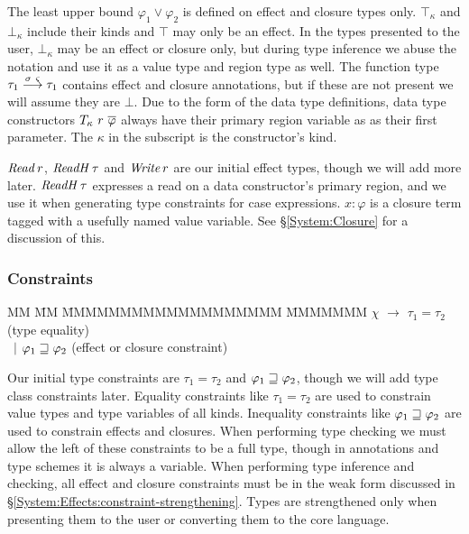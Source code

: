 The least upper bound $\varphi_1 \lor \varphi_2$ is defined on effect and closure types only. $\top_\kappa$ and $\bot_\kappa$ include their kinds and $\top$ may only be an effect. In the types presented to the user, $\bot_\kappa$ may be an effect or closure only, but during type inference we abuse the notation and use it as a value type and region type as well. The function type $\tau_1 \lfuna{\sigma \ \varsigma} \tau_1$ contains effect and closure annotations, but if these are not present we will assume they are $\bot$. Due to the form of the data type definitions, data type constructors $T_{\kappa} \ r \ \overline{\varphi}$ always have their primary region variable as as their first parameter. The $\kappa$ in the subscript is the constructor's kind. 

$\operatorname{\mathit{Read}} r$, $\operatorname{\mathit{ReadH}} \tau$ and $\operatorname{\mathit{Write}} r$ are our initial effect types, though we will add more later. $\operatorname{\mathit{ReadH}} \tau$ expresses a read on a data constructor's primary region, and we use it when generating type constraints for case expressions. $x : \varphi$  is a closure term tagged with a usefully named value variable. See \S\ref{System:Closure} for a discussion of this.



\bigskip
\bigskip
\vspace{-2em}
\subsubsection{Constraints}
\vspace{-1ex}
\begin{tabbing}
MM 	\= MM \= MMMMMMMMMMMMMMMMMMM \= MMMMMMM \kill
$\chi$ 	\> $\to$	\> $\tau_1 = \tau_2$				\> (type equality) \\
	\> \ $\mid$	\> $\varphi_1 \sqsupseteq \varphi_2$				\> (effect or closure constraint)
\end{tabbing}

Our initial type constraints are $\tau_1 = \tau_2$ and $\varphi_1 \sqsupseteq \varphi_2$, though we will add type class constraints later. Equality constraints like $\tau_1 = \tau_2$ are used to constrain value types and type variables of all kinds. Inequality constraints like $\varphi_1 \sqsupseteq \varphi_2$ are used to constrain effects and closures. When performing type checking we must allow the left of these constraints to be a full type, though in annotations and type schemes it is always a variable. When performing type inference and checking, all effect and closure constraints must be in the weak form discussed in \S\ref{System:Effects:constraint-strengthening}. Types are strengthened only when presenting them to the user or converting them to the core language.



